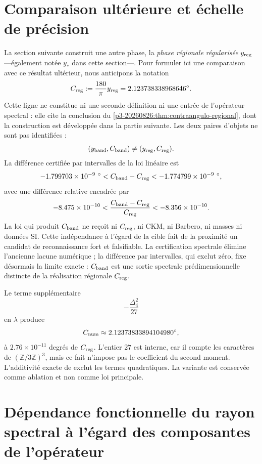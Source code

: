 \section{Comparaison ultérieure et échelle de précision}

La section suivante construit une autre phase, la \emph{phase régionale
régularisée} \(y_{\rm reg}\) ---également notée \(y_*\) dans cette section---. Pour
formuler ici une comparaison avec ce résultat ultérieur, nous anticipons la
notation
\[
 C_{\rm reg}:=\frac{180}{\pi}y_{\rm reg}
 =2.123738338968646^\circ.
\]
Cette ligne ne constitue ni une seconde définition ni une entrée de l’opérateur
spectral : elle cite la conclusion du
\cref{p3-20260826:thm:contraangulo-regional}, dont la construction est développée dans la
partie suivante.
Les deux paires d’objets ne sont pas identifiées :
\[
 (y_{\rm band},C_{\rm band})
 \ne
 (y_{\rm reg},C_{\rm reg}).
\]
La différence certifiée par intervalles de la loi linéaire est
\[
 -1.799703\times10^{-9}\ {}^\circ
 <C_{\rm band}-C_{\rm reg}
 <-1.774799\times10^{-9}\ {}^\circ,
\]
avec une différence relative encadrée par
\[
 -8.475\times10^{-10}
 <\frac{C_{\rm band}-C_{\rm reg}}{C_{\rm reg}}
 <-8.356\times10^{-10}.
\]
La loi qui produit \(C_{\rm band}\) ne reçoit ni \(C_{\rm reg}\), ni CKM, ni Barbero,
ni masses ni données SI\@. Cette indépendance à l’égard de la cible fait de la proximité un
candidat de reconnaissance fort et falsifiable. La certification spectrale
élimine l’ancienne lacune numérique ; la différence par intervalles, qui exclut
zéro, fixe désormais la limite exacte : \(C_{\rm band}\) est une sortie spectrale
prédimensionnelle distincte de la réalisation régionale
\(C_{\rm reg}\).

Le terme supplémentaire
\[
 -\frac{\Delta_4^2}{27}
\]
en \(\lambda\) produce
\[
 C_{\rm num}\approx2.12373833894104980{}^\circ,
\]
à \(2.76\times10^{-11}\) degrés de \(C_{\rm reg}\). L’entier \(27\) est interne,
car il compte les caractères de \((\mathbb Z/3\mathbb Z)^3\), mais ce
fait n’impose pas le coefficient du second moment. L’additivité exacte de
\HAdd exclut les termes quadratiques. La variante est conservée comme ablation et non
comme loi principale.

\section{Dépendance fonctionnelle du rayon spectral à l’égard des composantes de l’opérateur}

